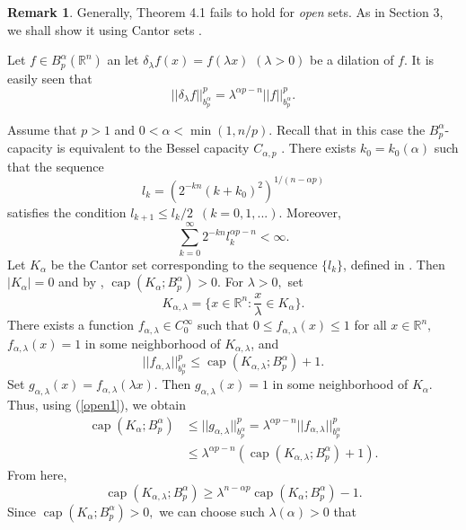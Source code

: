 \documentclass[12pt,twoside,reqno]{amsart}
\numberwithin{equation}{section}
\theoremstyle{definition}
\newtheorem{rem}[teo]{Remark}
\numberwithin{equation}{section}
\begin{document}
\begin{rem}\label{OPEN} Generally, Theorem 4.1 fails to hold for
{\it open} sets. As in Section 3, we shall show it using Cantor sets \cite[Section
5.3]{AH}.

Let $f\in B_p^{\alpha}({\mathbb{R}}^n)$ an let ${\delta}_{\lambda } f(x)=f({\lambda } x)$ $({\lambda }>0)$ be a
dilation of $f$. It is easily seen that
\begin{equation}\label{open1}
||{\delta}_{\lambda } f||_{b_p^{\alpha}}^p={\lambda }^{{\alpha} p-n}||f||_{b_p^{\alpha}}^p.
\end{equation}

Assume that $p>1$ and $0<{\alpha}<\min(1, n/p).$ Recall that in this case
the $B_p^{\alpha}$-capacity is equivalent to the Bessel capacity
$C_{{\alpha},p}$ \cite[p. 107]{AH}. There exists $k_0=k_0({\alpha})$ such that the sequence
$$l_k=(2^{-kn}(k+k_0)^2)^{1/(n-{\alpha} p)}$$ satisfies the condition $l_{k+1}\le l_k/2 \,\,\,(k=0,1,...).$
Moreover,
$$
\sum_{k=0}^\infty 2^{-kn}l_k^{{\alpha} p-n}<\infty.
$$
Let $K_{\alpha}$ be the Cantor set corresponding to the sequence $\{l_k\}$, defined in \cite[(5.3.1)]{AH}.
Then $|K_{\alpha}|=0$ and by  \cite[Theorem 5.3.2]{AH}, ${\operatorname{cap}}(K_{\alpha}; B_p^{\alpha})>0.$
 For ${\lambda }>0,$ set
$$
K_{{\alpha},{\lambda }}=\{x\in{\mathbb{R}}^n: \frac{x}{\lambda }\in K_{\alpha}\}.
$$
There exists a function $f_{{\alpha},{\lambda }}\in C_0^\infty$ such that $0\le
f_{{\alpha},{\lambda }}(x)\le 1$ for all $x\in{\mathbb{R}}^n,$ $f_{{\alpha},{\lambda }}(x)=1$ in some neighborhood of
$K_{{\alpha},{\lambda }}$, and
$$
||f_{{\alpha},{\lambda }}||_{b_p^{\alpha}}^p\le {\operatorname{cap}}(K_{{\alpha},{\lambda }}; B_p^{\alpha})+1.
$$
Set $g_{{\alpha},{\lambda }}(x)=f_{{\alpha},{\lambda }}({\lambda } x).$ Then $g_{{\alpha},{\lambda }}(x)=1$ in some neighborhood of
$K_{\alpha}$. Thus, using (\ref{open1}), we obtain
$$
\begin{aligned}
{\operatorname{cap}}(K_{\alpha}; B_p^{\alpha})&\le ||g_{{\alpha},{\lambda }}||_{b_p^{\alpha}}^p={\lambda }^{{\alpha} p-n}||f_{{\alpha},{\lambda }}||_{b_p^{\alpha}}^p\\
&\le {\lambda }^{{\alpha} p-n}({\operatorname{cap}}(K_{{\alpha},{\lambda }}; B_p^{\alpha})+1).
\end{aligned}
$$
From here,
$$
{\operatorname{cap}}(K_{{\alpha},{\lambda }}; B_p^{\alpha})\ge {\lambda }^{n-{\alpha} p}{\operatorname{cap}}(K_{\alpha}; B_p^{\alpha}) - 1.
$$
Since ${\operatorname{cap}}(K_{\alpha}; B_p^{\alpha})>0,$ we can choose such ${\lambda }({\alpha})>0$  that
$$
$$
\end{rem}
\end{document}
